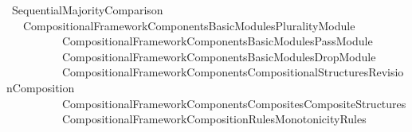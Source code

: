 %
\begin{isabellebody}%
%
%
\isadelimdocument
\isanewline
%
\endisadelimdocument
%
\isatagdocument
\isanewline
\isanewline
%
\isamarkuptrue%
%
\endisatagdocument
{\isafolddocument}%
%
\isadelimdocument
%
\endisadelimdocument
%
\isadelimtheory
%
\endisadelimtheory
%
\isatagtheory
{}\isamarkupfalse%
\ Sequential{\isacharunderscore}{\kern0pt}Majority{\isacharunderscore}{\kern0pt}Comparison\isanewline
\ \ \ {\isachardoublequoteopen}{\isachardot}{\kern0pt}{\isachardot}{\kern0pt}{\isacharslash}{\kern0pt}Compositional{\isacharunderscore}{\kern0pt}Framework{\isacharslash}{\kern0pt}Components{\isacharslash}{\kern0pt}Basic{\isacharunderscore}{\kern0pt}Modules{\isacharslash}{\kern0pt}Plurality{\isacharunderscore}{\kern0pt}Module{\isachardoublequoteclose}\isanewline
\ \ \ \ \ \ \ \ \ \ {\isachardoublequoteopen}{\isachardot}{\kern0pt}{\isachardot}{\kern0pt}{\isacharslash}{\kern0pt}Compositional{\isacharunderscore}{\kern0pt}Framework{\isacharslash}{\kern0pt}Components{\isacharslash}{\kern0pt}Basic{\isacharunderscore}{\kern0pt}Modules{\isacharslash}{\kern0pt}Pass{\isacharunderscore}{\kern0pt}Module{\isachardoublequoteclose}\isanewline
\ \ \ \ \ \ \ \ \ \ {\isachardoublequoteopen}{\isachardot}{\kern0pt}{\isachardot}{\kern0pt}{\isacharslash}{\kern0pt}Compositional{\isacharunderscore}{\kern0pt}Framework{\isacharslash}{\kern0pt}Components{\isacharslash}{\kern0pt}Basic{\isacharunderscore}{\kern0pt}Modules{\isacharslash}{\kern0pt}Drop{\isacharunderscore}{\kern0pt}Module{\isachardoublequoteclose}\isanewline
\ \ \ \ \ \ \ \ \ \ {\isachardoublequoteopen}{\isachardot}{\kern0pt}{\isachardot}{\kern0pt}{\isacharslash}{\kern0pt}Compositional{\isacharunderscore}{\kern0pt}Framework{\isacharslash}{\kern0pt}Components{\isacharslash}{\kern0pt}Compositional{\isacharunderscore}{\kern0pt}Structures{\isacharslash}{\kern0pt}Revision{\isacharunderscore}{\kern0pt}Composition{\isachardoublequoteclose}\isanewline
\ \ \ \ \ \ \ \ \ \ {\isachardoublequoteopen}{\isachardot}{\kern0pt}{\isachardot}{\kern0pt}{\isacharslash}{\kern0pt}Compositional{\isacharunderscore}{\kern0pt}Framework{\isacharslash}{\kern0pt}Components{\isacharslash}{\kern0pt}Composites{\isacharslash}{\kern0pt}Composite{\isacharunderscore}{\kern0pt}Structures{\isachardoublequoteclose}\isanewline
\ \ \ \ \ \ \ \ \ \ {\isachardoublequoteopen}{\isachardot}{\kern0pt}{\isachardot}{\kern0pt}{\isacharslash}{\kern0pt}Compositional{\isacharunderscore}{\kern0pt}Framework{\isacharslash}{\kern0pt}Composition{\isacharunderscore}{\kern0pt}Rules{\isacharslash}{\kern0pt}Monotonicity{\isacharunderscore}{\kern0pt}Rules{\isachardoublequoteclose}\isanewline

\end{isabellebody}
